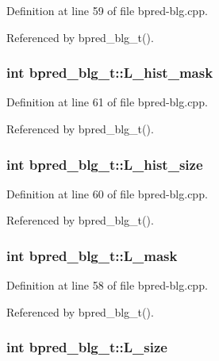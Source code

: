 Definition at line 59 of file bpred-blg.cpp.

Referenced by bpred\_\-blg\_\-t().
\subsubsection[{L\_\-hist\_\-mask}]{\setlength{\rightskip}{0pt plus 5cm}int {\bf bpred\_\-blg\_\-t::L\_\-hist\_\-mask}\hspace{0.3cm}{\tt  [protected]}}\label{classbpred__blg__t_2846dabd191e1aac5b355f03d19ecc83}




Definition at line 61 of file bpred-blg.cpp.

Referenced by bpred\_\-blg\_\-t().
\subsubsection[{L\_\-hist\_\-size}]{\setlength{\rightskip}{0pt plus 5cm}int {\bf bpred\_\-blg\_\-t::L\_\-hist\_\-size}\hspace{0.3cm}{\tt  [protected]}}\label{classbpred__blg__t_8492f616e909e64710737fb2f8a94a6f}




Definition at line 60 of file bpred-blg.cpp.

Referenced by bpred\_\-blg\_\-t().
\subsubsection[{L\_\-mask}]{\setlength{\rightskip}{0pt plus 5cm}int {\bf bpred\_\-blg\_\-t::L\_\-mask}\hspace{0.3cm}{\tt  [protected]}}\label{classbpred__blg__t_b412081b0050875521085e13ed4641ab}




Definition at line 58 of file bpred-blg.cpp.

Referenced by bpred\_\-blg\_\-t().
\subsubsection[{L\_\-size}]{\setlength{\rightskip}{0pt plus 5cm}int {\bf bpred\_\-blg\_\-t::L\_\-size}\hspace{0.3cm}{\tt  [protected]}}\label{classbpred__blg__t_3248dc8470eff1765564ef2a37e6914d}




